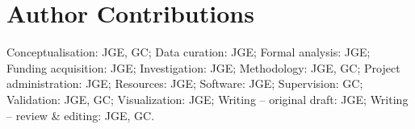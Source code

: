 \section*{Author Contributions}
Conceptualisation: JGE, GC; Data curation: JGE; Formal analysis: JGE; Funding acquisition: JGE; Investigation: JGE; Methodology: JGE, GC; Project administration: JGE; Resources: JGE; Software: JGE; Supervision: GC; Validation: JGE, GC; Visualization: JGE; Writing – original draft: JGE; Writing – review \& editing: JGE, GC.

